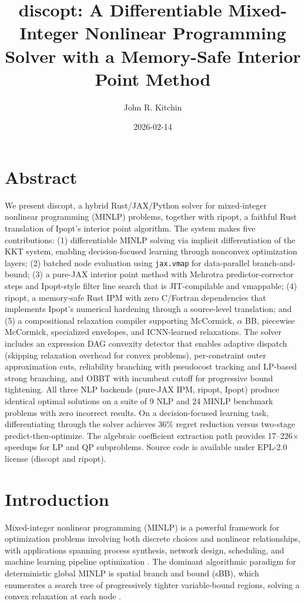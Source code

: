 \documentclass[12pt,preprint]{article}
\title{discopt: A Differentiable Mixed-Integer Nonlinear Programming Solver with a Memory-Safe Interior Point Method}
\author{John R. Kitchin}
\date{2026-02-14}
\begin{document}
\maketitle

\section{Abstract}
\label{org-abstract}
We present discopt, a hybrid Rust/JAX/Python solver for mixed-integer nonlinear programming (MINLP) problems, together with ripopt, a faithful Rust translation of Ipopt's interior point algorithm. The system makes five contributions: (1) differentiable MINLP solving via implicit differentiation of the KKT system, enabling decision-focused learning through nonconvex optimization layers; (2) batched node evaluation using \texttt{jax.vmap} for data-parallel branch-and-bound; (3) a pure-JAX interior point method with Mehrotra predictor-corrector steps and Ipopt-style filter line search that is JIT-compilable and vmappable; (4) ripopt, a memory-safe Rust IPM with zero C/Fortran dependencies that implements Ipopt's numerical hardening through a source-level translation; and (5) a compositional relaxation compiler supporting McCormick, $\alpha$ BB, piecewise McCormick, specialized envelopes, and ICNN-learned relaxations. The solver includes an expression DAG convexity detector that enables adaptive dispatch (skipping relaxation overhead for convex problems), per-constraint outer approximation cuts, reliability branching with pseudocost tracking and LP-based strong branching, and OBBT with incumbent cutoff for progressive bound tightening. All three NLP backends (pure-JAX IPM, ripopt, Ipopt) produce identical optimal solutions on a suite of 9 NLP and 24 MINLP benchmark problems with zero incorrect results. On a decision-focused learning task, differentiating through the solver achieves 36\% regret reduction versus two-stage predict-then-optimize. The algebraic coefficient extraction path provides 17--226$\times$ speedups for LP and QP subproblems. Source code is available under EPL-2.0 license (discopt and ripopt).


\section{Introduction}
\label{org-introduction}
Mixed-integer nonlinear programming (MINLP) is a powerful framework for optimization problems involving both discrete choices and nonlinear relationships, with applications spanning process synthesis, network design, scheduling, and machine learning pipeline optimization \cite{Belotti2013,Grossmann2021}. The dominant algorithmic paradigm for deterministic global MINLP is spatial branch and bound (sBB), which enumerates a search tree of progressively tighter variable-bound regions, solving a convex relaxation at each node \cite{Land1960,Dakin1965,Smith1999}.
\end{document}
